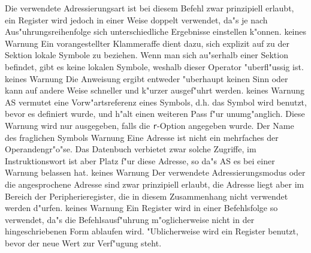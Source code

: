 \documentclass[12pt,a4paper,twoside]{report}
\newcommand{\tty}[1]{{\tt #1}}
\begin{document}
{\begin{description}
               {Die verwendete Adressierungsart ist bei
                diesem Befehl zwar prinzipiell erlaubt, ein Register
                wird jedoch in einer Weise doppelt verwendet, da"s je
                nach Aus"uhrungsreihenfolge sich unterschiedliche
                Ergebnisse einstellen k"onnen.}
               {keines}
               {Warnung}
               {Ein vorangestellter Klammeraffe dient
                dazu, sich explizit auf zu der Sektion lokale Symbole
                zu beziehen.  Wenn man sich au"serhalb einer Sektion
                befindet, gibt es keine lokalen Symbole, weshalb dieser
                Operator "uberfl"ussig ist.}
               {keines}
               {Warnung}
               {Die Anweisung ergibt entweder "uberhaupt
                keinen Sinn oder kann auf andere Weise schneller und k"urzer
                ausgef"uhrt werden.}
               {keines}
               {Warnung}
               {AS vermutet eine Vorw"artsreferenz eines
                Symbols, d.h. das Symbol wird benutzt, bevor es definiert
                wurde, und h"alt einen weiteren Pass f"ur unumg"anglich.
                Diese Warnung wird nur ausgegeben, falls die \tty{r}-Option
                angegeben wurde.}
               {Der Name des fraglichen Symbols}
               {Warnung}
               {Eine Adresse ist nicht ein mehrfaches der
                Operandengr"o"se.  Das Datenbuch verbietet zwar solche Zugriffe,
                im Instruktionswort ist aber Platz f"ur diese Adresse, so da"s
                AS es bei einer Warnung belassen hat.}
               {keines}
               {Warnung}
               {Der verwendete Adressierungsmodus oder die
                angesprochene Adresse sind zwar prinzipiell erlaubt, die
                Adresse liegt aber im Bereich der Peripherieregister, die in
                diesem Zusammenhang nicht verwendet werden d"urfen.}
               {keines}
               {Warnung}
               {Ein Register wird in einer Befehlsfolge so
                verwendet, da"s die Befehlsausf"uhrung m"oglicherweise nicht
                in der hingeschriebenen Form ablaufen wird.  "Ublicherweise
                wird ein Register benutzt, bevor der neue Wert zur Verf"ugung
                steht.}

\end{description}}
\end{document}
